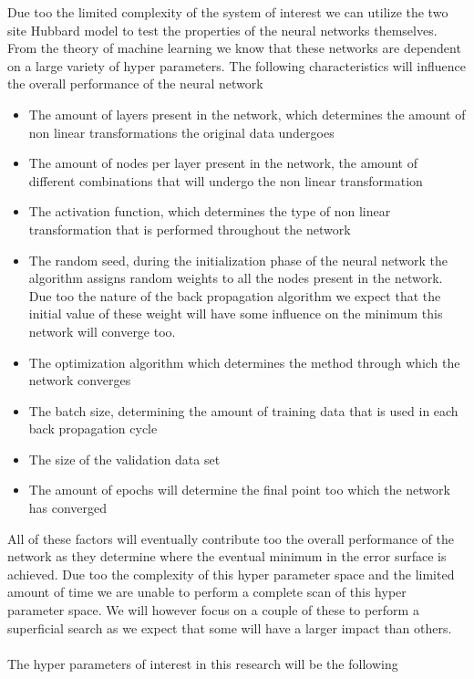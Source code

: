 \documentclass[]{article}
\begin{document}
Due too the limited complexity of the system of interest we can utilize the two site Hubbard model to test the properties of the neural networks themselves. From the theory of machine learning we know that these networks are dependent on a large variety of hyper parameters. The following characteristics will influence the overall performance of the neural network
\begin{itemize}
\item The amount of layers present in the network, which determines the amount of non linear transformations the original data undergoes
\item The amount of nodes per layer present in the network, the amount of different combinations that will undergo the non linear transformation
\item The activation function, which determines the type of non linear transformation that is performed throughout the network
\item The random seed, during the initialization phase of the neural network the algorithm assigns random weights to all the nodes present in the network. Due too the nature of the back propagation algorithm we expect that the initial value of these weight will have some influence on the minimum this network will converge too.
\item The optimization algorithm which determines the method through which the network converges
\item The batch size, determining the amount of training data that is used in each back propagation cycle
\item The size of the validation data set
\item The amount of epochs will determine the final point too which the network has converged  
\end{itemize}
All of these factors will eventually contribute too the overall performance of the network as they determine where the eventual minimum in the error surface is achieved. Due too the complexity of this hyper parameter space and the limited amount of time we are unable to perform a complete scan of this hyper parameter space. We will however focus on a couple of these to perform a superficial search as we expect that some will have a larger impact than others.
\\
\\
The hyper parameters of interest in this research will be the following
\end{document}
